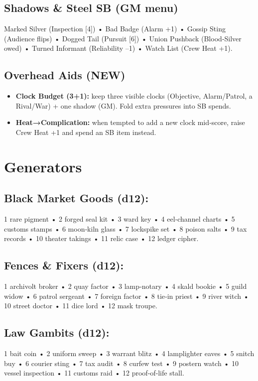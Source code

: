 \documentclass[11pt]{article}
\begin{document}
\subsection{Shadows \& Steel SB (GM menu)}
Marked Silver (Inspection [4]) • Bad Badge (Alarm +1) • Gossip Sting (Audience flips) • Dogged Tail (Pursuit [6]) • Union Pushback (Blood‑Silver owed) • Turned Informant (Reliability --1) • Watch List (Crew Heat +1).

\subsection{Overhead Aids (NEW)}
\begin{itemize}
\item \textbf{Clock Budget (3+1):} keep three visible clocks (Objective, Alarm/Patrol, a Rival/War) + one shadow (GM). Fold extra pressures into SB spends.
\item \textbf{Heat→Complication:} when tempted to add a new clock mid‑score, raise Crew Heat +1 and spend an SB item instead.
\end{itemize}

\section{Generators}
\subsection*{Black Market Goods (d12):} 1 rare pigment • 2 forged seal kit • 3 ward key • 4 eel‑channel charts • 5 customs stamps • 6 moon‑kiln glass • 7 lockspike set • 8 poison salts • 9 tax records • 10 theater takings • 11 relic case • 12 ledger cipher.

\subsection*{Fences \& Fixers (d12):} 1 archivolt broker • 2 quay factor • 3 lamp‑notary • 4 skald bookie • 5 guild widow • 6 patrol sergeant • 7 foreign factor • 8 tie‑in priest • 9 river witch • 10 street doctor • 11 dice lord • 12 mask troupe.

\subsection*{Law Gambits (d12):} 1 bait coin • 2 uniform sweep • 3 warrant blitz • 4 lamplighter eaves • 5 snitch buy • 6 courier sting • 7 tax audit • 8 curfew test • 9 postern watch • 10 vessel inspection • 11 customs raid • 12 proof‑of‑life stall.
\end{document}
